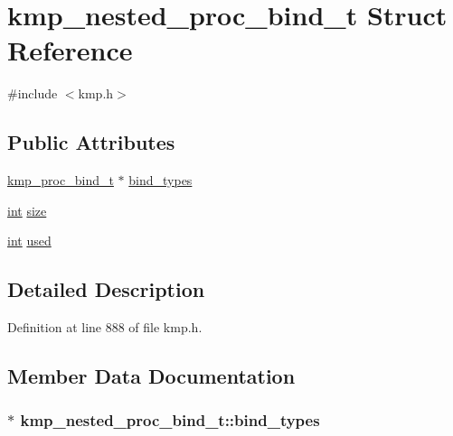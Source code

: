 \hypertarget{structkmp__nested__proc__bind__t}{\section{kmp\-\_\-nested\-\_\-proc\-\_\-bind\-\_\-t Struct Reference}
\label{structkmp__nested__proc__bind__t}
}


{\ttfamily \#include $<$kmp.\-h$>$}

\subsection*{Public Attributes}
\begin{DoxyCompactItemize}
\item 
\hyperlink{kmp_8h_ae587debf3f0331e4f824daa05f47a241}{kmp\-\_\-proc\-\_\-bind\-\_\-t} $\ast$ \hyperlink{structkmp__nested__proc__bind__t_a9dd5b54da2cd6bdcf6b056cb3593dbe2}{bind\-\_\-types}
\item 
\hyperlink{ittnotify__static_8h_a8b8dcd723308a8cb5d84277c7a3fff70}{int} \hyperlink{structkmp__nested__proc__bind__t_a8d4665f73ce63116fafb7568c4b4c4b1}{size}
\item 
\hyperlink{ittnotify__static_8h_a8b8dcd723308a8cb5d84277c7a3fff70}{int} \hyperlink{structkmp__nested__proc__bind__t_a4ab1e74b13e91c54a0ff105c9d7db9f6}{used}
\end{DoxyCompactItemize}


\subsection{Detailed Description}


Definition at line 888 of file kmp.\-h.



\subsection{Member Data Documentation}
\hypertarget{structkmp__nested__proc__bind__t_a9dd5b54da2cd6bdcf6b056cb3593dbe2}{
\subsubsection[{bind\-\_\-types}]{$\ast$ kmp\-\_\-nested\-\_\-proc\-\_\-bind\-\_\-t\-::bind\-\_\-types}}\label{structkmp__nested__proc__bind__t_a9dd5b54da2cd6bdcf6b056cb3593dbe2}


